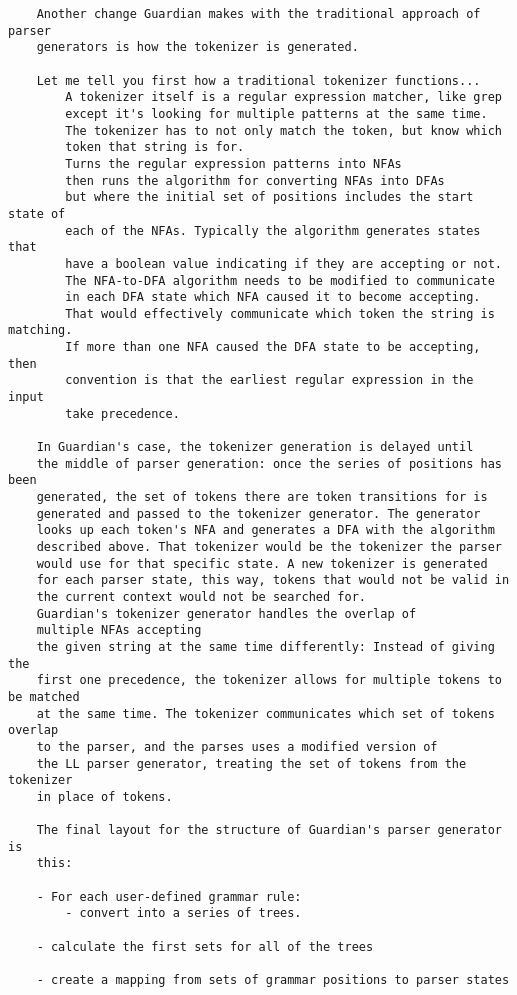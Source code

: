 {\begin{verbatim}
	Another change Guardian makes with the traditional approach of parser
	generators is how the tokenizer is generated.

	Let me tell you first how a traditional tokenizer functions...
		A tokenizer itself is a regular expression matcher, like grep
		except it's looking for multiple patterns at the same time.
		The tokenizer has to not only match the token, but know which
		token that string is for.
		Turns the regular expression patterns into NFAs
		then runs the algorithm for converting NFAs into DFAs
		but where the initial set of positions includes the start state of
		each of the NFAs. Typically the algorithm generates states that
		have a boolean value indicating if they are accepting or not.
		The NFA-to-DFA algorithm needs to be modified to communicate
		in each DFA state which NFA caused it to become accepting.
		That would effectively communicate which token the string is matching.
		If more than one NFA caused the DFA state to be accepting, then
		convention is that the earliest regular expression in the input
		take precedence.

	In Guardian's case, the tokenizer generation is delayed until
	the middle of parser generation: once the series of positions has been
	generated, the set of tokens there are token transitions for is
	generated and passed to the tokenizer generator. The generator
	looks up each token's NFA and generates a DFA with the algorithm
	described above. That tokenizer would be the tokenizer the parser
	would use for that specific state. A new tokenizer is generated
	for each parser state, this way, tokens that would not be valid in
	the current context would not be searched for.
	Guardian's tokenizer generator handles the overlap of
	multiple NFAs accepting
	the given string at the same time differently: Instead of giving the
	first one precedence, the tokenizer allows for multiple tokens to be matched
	at the same time. The tokenizer communicates which set of tokens overlap
	to the parser, and the parses uses a modified version of
	the LL parser generator, treating the set of tokens from the tokenizer
	in place of tokens.

	The final layout for the structure of Guardian's parser generator is
	this:

	- For each user-defined grammar rule:
		- convert into a series of trees.

	- calculate the first sets for all of the trees

	- create a mapping from sets of grammar positions to parser states


\end{verbatim}}
